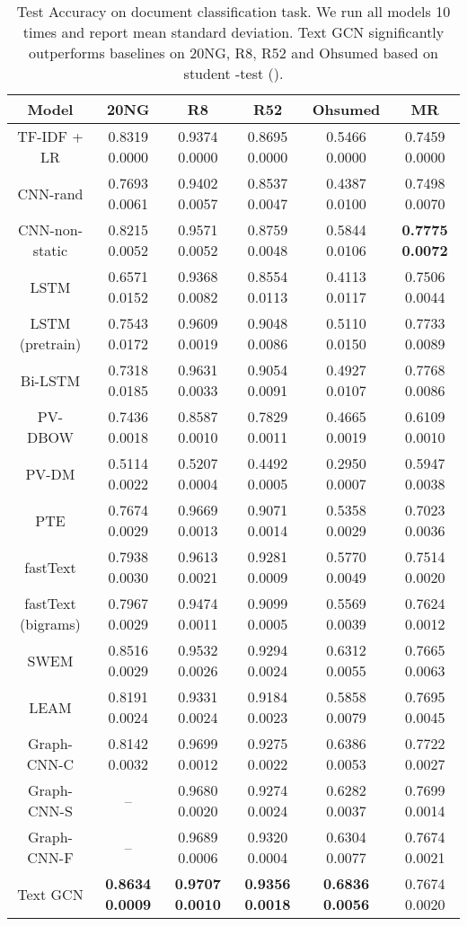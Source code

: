 \documentclass[letterpaper]{article} \usepackage{aaai19}  \usepackage{times}  \usepackage{helvet}  \usepackage{courier}  \usepackage{url}  \usepackage{graphicx}  \frenchspacing  \usepackage{amsmath}
\begin{document}
    \begin{table*}[t]\footnotesize
    \centering
    \renewcommand{\arraystretch}{1.2}
    
    \caption{Test Accuracy on document classification task. We run all models 10 times and report mean  standard deviation. Text GCN significantly outperforms baselines on 20NG, R8, R52 and Ohsumed based on student -test ().}
    \begin{tabular}{c|c|c|c|c|c}
    \hline
    \bf{Model}& \bf{20NG}	& \bf{R8}& \bf{R52}& \bf{Ohsumed} & \bf{MR}\\
    \hline
 TF-IDF + LR & 0.8319  0.0000 & 0.9374  0.0000 & 0.8695  0.0000 & 0.5466  0.0000 & 0.7459  0.0000 \\
   
     CNN-rand &0.7693  0.0061&0.9402  0.0057 & 0.8537  0.0047 & 0.4387  0.0100& 0.7498  0.0070 \\
     CNN-non-static &0.8215  0.0052& 0.9571  0.0052& 0.8759  0.0048 & 0.5844  0.0106& \bf{0.7775  0.0072}  \\
    LSTM &0.6571  0.0152& 0.9368  0.0082& 0.8554  0.0113 &0.4113  0.0117 & 0.7506  0.0044 \\
    LSTM (pretrain) &0.7543  0.0172& 0.9609  0.0019&0.9048  0.0086 &0.5110  0.0150 & 0.7733  0.0089 \\
    Bi-LSTM &0.7318  0.0185& 0.9631  0.0033& 0.9054  0.0091 &0.4927  0.0107& 0.7768  0.0086 \\
    PV-DBOW &0.7436  0.0018& 0.8587  0.0010& 0.7829  0.0011 & 0.4665  0.0019& 0.6109  0.0010  \\
    PV-DM &0.5114  0.0022& 0.5207  0.0004&  0.4492  0.0005& 0.2950  0.0007& 0.5947  0.0038 \\
    PTE & 0.7674  0.0029&0.9669  0.0013 & 0.9071  0.0014 & 0.5358  0.0029 & 0.7023  0.0036\\
    fastText &0.7938  0.0030& 0.9613  0.0021& 0.9281   0.0009  & 0.5770  0.0049 &  0.7514  0.0020\\
    fastText (bigrams) & 0.7967  0.0029& 0.9474  0.0011& 0.9099  0.0005 &0.5569  0.0039 & 0.7624  0.0012 \\
    SWEM &0.8516  0.0029& 0.9532  0.0026& 0.9294  0.0024 & 0.6312  0.0055& 0.7665  0.0063 \\
    LEAM &0.8191  0.0024& 0.9331  0.0024 & 0.9184  0.0023 & 0.5858  0.0079& 0.7695  0.0045 \\
    Graph-CNN-C &0.8142  0.0032& 0.9699  0.0012&  0.9275  0.0022& 0.6386  0.0053&  0.7722   0.0027\\
    Graph-CNN-S &--& 0.9680  0.0020& 0.9274  0.0024 &0.6282  0.0037 & 0.7699  0.0014 \\
	Graph-CNN-F &--&0.9689  0.0006 & 0.9320  0.0004 &0.6304  0.0077& 0.7674  0.0021 \\
   	Text GCN &\bf{0.8634  0.0009}& \bf{0.9707  0.0010}& \bf{0.9356  0.0018}& \bf{0.6836  0.0056}& 0.7674  0.0020 \\
    \hline
    \end{tabular}
    \label{tab:results}
    \end{table*}
\end{document}
